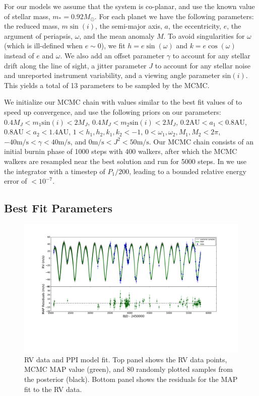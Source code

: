 For our models we assume that the system is co-planar, and use the known value of stellar mass, $m_* = 0.92M_{\odot}$.
For each planet we have the following parameters: the reduced mass, $m\sin(i)$, the semi-major axis, $a$, the eccentricity, $e$, the argument of periapsis, $\omega$, and the mean anomaly $M$. 
To avoid singularities for $\omega$ (which is ill-defined when $e\sim0$), we fit $h=e\sin(\omega)$ and $k=e\cos(\omega)$ instead of $e$ and $\omega$.
We also add an offset parameter $\gamma$ to account for any stellar drift along the line of sight, a jitter parameter $J$ to account for any stellar noise and unreported instrument variability, and a viewing angle parameter sin$(i)$.
This yields a total of 13 parameters to be sampled by the MCMC. 

We initialize our MCMC chain with values similar to the best fit values of \R to speed up convergence, and use the following priors on our parameters: $0.4M_J<m_1\textrm{sin}(i) < 2M_J$, $0.4M_J<m_2\textrm{sin}(i) < 2M_J$, $0.2 \textrm{AU}<a_1< 0.8\textrm{AU}$, $0.8\textrm{AU}<a_2< 1.4\textrm{AU}$, $1<h_1, h_2, k_1, k_2<-1$, $0<\omega_1, \omega_2, M_1, M_2<2\pi$, $-40\textrm{m/s}<\gamma<40\textrm{m/s}$, and $0\textrm{m/s}<J^2<50\textrm{m/s}$.
Our MCMC chain consists of an initial burnin phase of 1000 steps with 400 walkers, after which the MCMC walkers are resampled near the best solution and run for 5000 steps.
In \reb we use the \whfast integrator \citep{Rein2015b} with a timestep of $P_1/200$, leading to a bounded relative energy error of $<10^{-7}$.


\subsection{Best Fit Parameters}
\label{sec:Results}
\begin{figure}
\includegraphics[trim=4.4cm 8cm 4.5cm 0cm, width=\textwidth]{chap6/images/hk_400walk_5000it_chkpt1_MAP_RV.pdf}
\caption{RV data and PPI model fit. 
Top panel shows the RV data points, MCMC MAP value (green), and 80 randomly plotted samples from the posterior (black). 
Bottom panel shows the residuals for the MAP fit to the RV data. 
 }
\label{fig:MCMC}
\end{figure}

